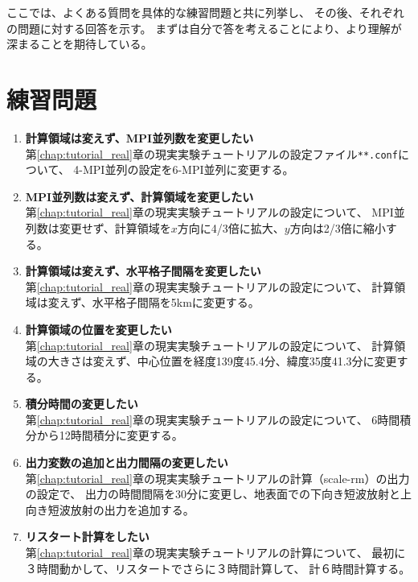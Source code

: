 ここでは、よくある質問を具体的な練習問題と共に列挙し、
その後、それぞれの問題に対する回答を示す。
まずは自分で答を考えることにより、より理解が深まることを期待している。


\section*{練習問題}

\begin{enumerate}
\item {\bf 計算領域は変えず、MPI並列数を変更したい}\\
第\ref{chap:tutorial_real}章の現実実験チュートリアルの設定ファイル\verb|**.conf|について、
4-MPI並列の設定を6-MPI並列に変更する。

\item {\bf MPI並列数は変えず、計算領域を変更したい}\\
第\ref{chap:tutorial_real}章の現実実験チュートリアルの設定について、
MPI並列数は変更せず、計算領域を$x$方向に4/3倍に拡大、$y$方向は2/3倍に縮小する。

\item {\bf 計算領域は変えず、水平格子間隔を変更したい}\\
第\ref{chap:tutorial_real}章の現実実験チュートリアルの設定について、
計算領域は変えず、水平格子間隔を5kmに変更する。

\item {\bf 計算領域の位置を変更したい}\\
第\ref{chap:tutorial_real}章の現実実験チュートリアルの設定について、
計算領域の大きさは変えず、中心位置を経度139度45.4分、緯度35度41.3分に変更する。

\item {\bf 積分時間の変更したい}\\
第\ref{chap:tutorial_real}章の現実実験チュートリアルの設定について、
6時間積分から12時間積分に変更する。

\item {\bf 出力変数の追加と出力間隔の変更したい}\\
第\ref{chap:tutorial_real}章の現実実験チュートリアルの計算（scale-rm）の出力の設定で、
出力の時間間隔を30分に変更し、地表面での下向き短波放射と上向き短波放射の出力を追加する。

\item {\bf リスタート計算をしたい}\\
第\ref{chap:tutorial_real}章の現実実験チュートリアルの計算について、
最初に３時間動かして、リスタートでさらに３時間計算して、
計６時間計算する。




\end{enumerate}

